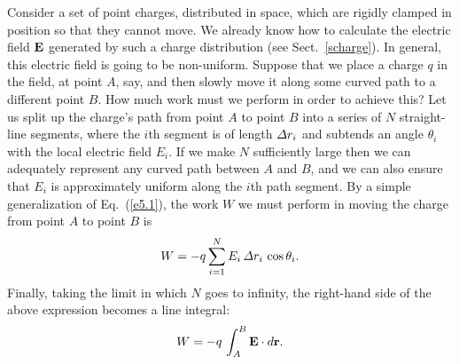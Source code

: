 Consider  a set of point  charges,
distributed in space, which are rigidly clamped in position so that they cannot
move. We already know how to calculate the electric field ${\bf E}$ generated by such a
charge distribution (see Sect.~\ref{scharge}). In general, this electric
field is going to be
non-uniform. Suppose that we place a charge $q$ in the field, at point $A$, say,
and 
then slowly
move it along some curved path to a different point $B$. How much work must we perform in order to
achieve this? Let us split up the charge's path from point $A$ to point
$B$ into a series of $N$ straight-line segments, where the $i$th segment
is of length ${\mit\Delta}r_i$ and subtends an angle $\theta_i$ with the
local electric field $E_i$. If we make $N$ sufficiently large then we can
adequately represent any curved path between $A$ and $B$, and we can also ensure
that $E_i$ is approximately uniform along the $i$th path segment. By a simple
generalization of  Eq.~(\ref{e5.1}), the work $W$ we must perform in moving
the charge from point $A$ to point $B$ is 
\begin{equation}\label{e5.2}
W =- q\sum_{i=1}^N E_i\,{\mit\Delta}r_i\,\cos\theta_i.
\end{equation}
Finally, taking the limit in which $N$ goes to infinity, the right-hand side of
the above expression becomes a line integral:
\begin{equation}\label{e5.3}
W = - q\,\int_A^B{\bf E}\cdot d{\bf r}.
\end{equation}

